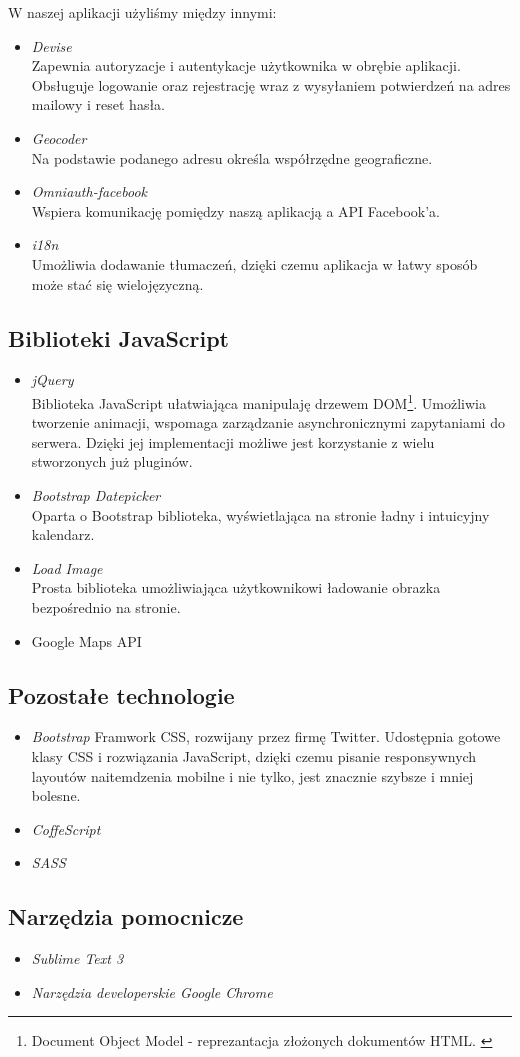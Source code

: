     W naszej aplikacji użyliśmy między innymi:
    \begin{itemize}
      \item \emph{Devise} \\ Zapewnia autoryzacje i autentykacje użytkownika w obrębie aplikacji. Obsługuje logowanie oraz rejestrację wraz z wysyłaniem potwierdzeń na adres mailowy i reset hasła.
      \item \emph{Geocoder} \\ Na podstawie podanego adresu określa współrzędne geograficzne.
      \item \emph{Omniauth-facebook} \\ Wspiera komunikację pomiędzy naszą aplikacją a API Facebook'a.
      \item \emph{i18n} \\ Umożliwia dodawanie tłumaczeń, dzięki czemu aplikacja w łatwy sposób może stać się wielojęzyczną.
    \end{itemize}
  \subsection{Biblioteki JavaScript}
    \begin{itemize}
      \item \emph{jQuery} \\ Biblioteka JavaScript ułatwiająca manipulaję drzewem DOM\footnote{Document Object Model - reprezantacja złożonych dokumentów HTML. \cite{html5_css3}}. Umożliwia tworzenie animacji, wspomaga zarządzanie asynchronicznymi zapytaniami do serwera. Dzięki jej implementacji możliwe jest korzystanie z wielu stworzonych już pluginów.
      \item \emph{Bootstrap Datepicker} \\ Oparta o Bootstrap biblioteka, wyświetlająca na stronie ładny i intuicyjny kalendarz.
      \item \emph{Load Image} \\ Prosta biblioteka umożliwiająca użytkownikowi ładowanie obrazka bezpośrednio na stronie.
      \item Google Maps API
    \end{itemize}
  \subsection{Pozostałe technologie}
    \begin{itemize}
      \item \emph{Bootstrap}
        Framwork CSS, rozwijany przez firmę Twitter. Udostępnia gotowe klasy CSS i rozwiązania JavaScript, dzięki czemu pisanie responsywnych layoutów naitemdzenia mobilne i nie tylko, jest znacznie szybsze i mniej bolesne.
      \item \emph{CoffeScript}
      \item \emph{SASS}
    \end{itemize}
  \subsection{Narzędzia pomocnicze}
    \begin{itemize}
      \item \emph{Sublime Text 3}
      \item \emph{Narzędzia developerskie Google Chrome}
    \end{itemize}
